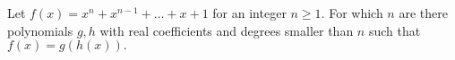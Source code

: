 Let $f(x) = x^n+x^{n-1}+\dots+x+1$ for an integer $n\ge 1.$ For which $n$ are there polynomials $g, h$ with real coefficients and degrees smaller than $n$ such that $f(x) = g(h(x)).$